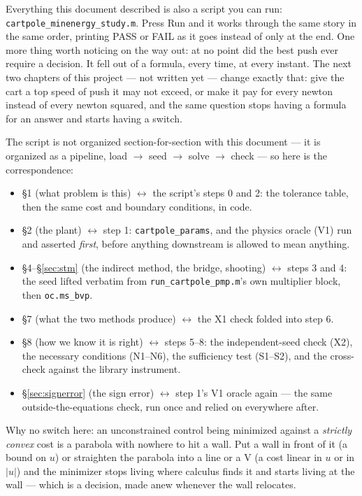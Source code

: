 \documentclass[11pt]{article}
\newcommand{\file}[1]{\texttt{#1}}
\begin{document}
\begin{eli}
Everything this document described is also a script you can run:
\file{cartpole\_minenergy\_study.m}. Press Run and it works through the same
story in the same order, printing PASS or FAIL as it goes instead of only at
the end. One more thing worth noticing on the way out: at no point did the
best push ever require a decision. It fell out of a formula, every time, at
every instant. The next two chapters of this project --- not written yet ---
change exactly that: give the cart a top speed of push it may not exceed, or
make it pay for every newton instead of every newton squared, and the same
question stops having a formula for an answer and starts having a switch.
\end{eli}

\begin{intu}
The script is not organized section-for-section with this document --- it is
organized as a pipeline, load $\to$ seed $\to$ solve $\to$ check --- so here is
the correspondence:
\begin{itemize}\itemsep2pt
\item \S1 (what problem is this) $\leftrightarrow$ the script's steps 0 and 2:
  the tolerance table, then the same cost and boundary conditions, in code.
\item \S2 (the plant) $\leftrightarrow$ step 1: \file{cartpole\_params}, and
  the physics oracle (V1) run and asserted \emph{first}, before anything
  downstream is allowed to mean anything.
\item \S4--\S\ref{sec:stm} (the indirect method, the bridge, shooting)
  $\leftrightarrow$ steps 3 and 4: the seed lifted verbatim from
  \file{run\_cartpole\_pmp.m}'s own multiplier block, then \texttt{oc.ms\_bvp}.
\item \S7 (what the two methods produce) $\leftrightarrow$ the X1 check
  folded into step 6.
\item \S8 (how we know it is right) $\leftrightarrow$ steps 5--8: the
  independent-seed check (X2), the necessary conditions (N1--N6), the
  sufficiency test (S1--S2), and the cross-check against the library
  instrument.
\item \S\ref{sec:signerror} (the sign error) $\leftrightarrow$ step 1's V1
  oracle again --- the same outside-the-equations check, run once and relied
  on everywhere after.
\end{itemize}
Why no switch here: an unconstrained control being minimized against a
\emph{strictly convex} cost is a parabola with nowhere to hit a wall. Put a
wall in front of it (a bound on $u$) or straighten the parabola into a line
or a V (a cost linear in $u$ or in $|u|$) and the minimizer stops living where
calculus finds it and starts living at the wall --- which is a decision, made
anew whenever the wall relocates.
\end{intu}
\end{document}

